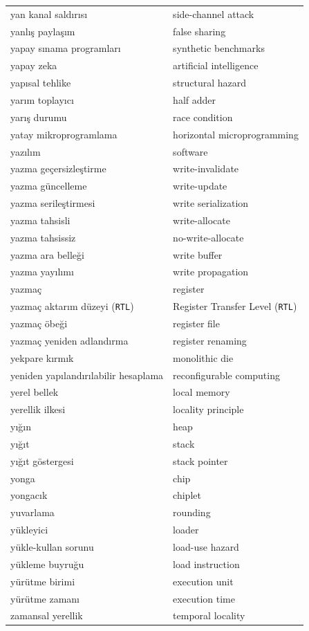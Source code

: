 {\begin{longtable}{@{}p{7.6cm}p{7.6cm}@{}}
yan kanal saldırısı & side-channel attack \\
yanlış paylaşım & false sharing \\
yapay sınama programları & synthetic benchmarks \\
yapay zeka & artificial intelligence \\
yapısal tehlike & structural hazard \\
yarım toplayıcı & half adder \\
yarış durumu & race condition \\
yatay mikroprogramlama & horizontal microprogramming \\
yazılım & software \\
yazma geçersizleştirme & write-invalidate \\
yazma güncelleme & write-update \\
yazma serileştirmesi & write serialization \\
yazma tahsisli & write-allocate \\
yazma tahsissiz & no-write-allocate \\
yazma ara belleği & write buffer \\
yazma yayılımı & write propagation \\
yazmaç & register \\
yazmaç aktarım düzeyi (\texttt{RTL}) & Register Transfer Level (\texttt{RTL}) \\
yazmaç öbeği & register file \\
yazmaç yeniden adlandırma & register renaming \\
yekpare kırmık & monolithic die \\
yeniden yapılandırılabilir hesaplama & reconfigurable computing \\
yerel bellek & local memory \\
yerellik ilkesi & locality principle \\
yığın & heap \\
yığıt & stack \\
yığıt göstergesi & stack pointer \\
yonga & chip \\
yongacık & chiplet \\
yuvarlama & rounding \\
yükleyici & loader \\
yükle-kullan sorunu & load-use hazard \\
yükleme buyruğu & load instruction \\
yürütme birimi & execution unit \\
yürütme zamanı & execution time \\

zamansal yerellik & temporal locality \\

\end{longtable}
}


